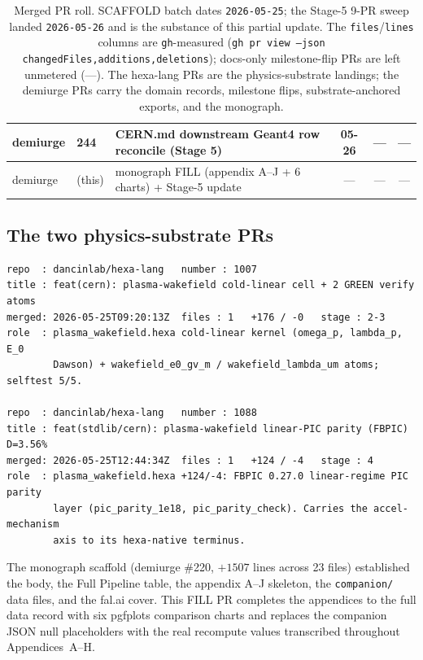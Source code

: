 \begin{table}[h]
\begin{tabular}{@{}l l >{\raggedright\arraybackslash}m{4.4cm} c c c@{}}
demiurge  & 244  & CERN.md downstream Geant4 row reconcile (Stage 5) & 05-26 & --- & --- \\
\midrule
demiurge  & (this) & monograph FILL (appendix A--J + 6 charts) + Stage-5 update & --- & --- & --- \\
\bottomrule
\end{tabular}
\caption{Merged PR roll. SCAFFOLD batch dates \texttt{2026-05-25}; the
Stage-5 9-PR sweep landed \texttt{2026-05-26} and is the substance of
this partial update. The \texttt{files}/\texttt{lines} columns are
\texttt{gh}-measured (\texttt{gh pr view --json
changedFiles,additions,deletions}); docs-only milestone-flip PRs are left
unmetered (---). The hexa-lang PRs are the physics-substrate landings;
the demiurge PRs carry the domain records, milestone flips,
substrate-anchored exports, and the monograph.}
\label{tab:app-prroll}
\end{table}

\subsection{The two physics-substrate PRs}
\label{app:prroll-physics}

\begin{lstlisting}
repo  : dancinlab/hexa-lang   number : 1007
title : feat(cern): plasma-wakefield cold-linear cell + 2 GREEN verify atoms
merged: 2026-05-25T09:20:13Z  files : 1   +176 / -0   stage : 2-3
role  : plasma_wakefield.hexa cold-linear kernel (omega_p, lambda_p, E_0
        Dawson) + wakefield_e0_gv_m / wakefield_lambda_um atoms; selftest 5/5.

repo  : dancinlab/hexa-lang   number : 1088
title : feat(stdlib/cern): plasma-wakefield linear-PIC parity (FBPIC) D=3.56%
merged: 2026-05-25T12:44:34Z  files : 1   +124 / -4   stage : 4
role  : plasma_wakefield.hexa +124/-4: FBPIC 0.27.0 linear-regime PIC parity
        layer (pic_parity_1e18, pic_parity_check). Carries the accel-mechanism
        axis to its hexa-native terminus.
\end{lstlisting}

\noindent
The monograph scaffold (demiurge \#220, $+1507$ lines across 23 files)
established the body, the Full Pipeline table, the appendix A--J skeleton,
the \texttt{companion/} data files, and the fal.ai cover. This FILL PR
completes the appendices to the full data record with six pgfplots
comparison charts and replaces the companion JSON null placeholders with
the real recompute values transcribed throughout Appendices~A--H.

